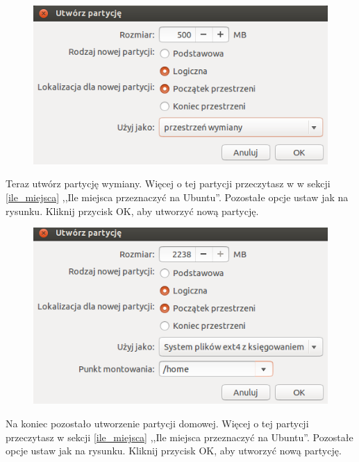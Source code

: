 \begin{figure}
                \includegraphics[width=\linewidth]{images/instalator_partycjonowanie_gparted_dodaj_swap.png}
\end{figure}
Teraz utwórz partycję wymiany. Więcej o tej partycji przeczytasz w w sekcji \ref{ile_miejsca} ,,Ile miejsca przeznaczyć na Ubuntu''. Pozostałe opcje ustaw jak na rysunku. Kliknij przycisk \textcolor{ubuntu_orange}{OK}, aby utworzyć nową partycję.
\begin{figure}
                \includegraphics[width=\linewidth]{images/instalator_partycjonowanie_gparted_dodaj_home.png}
\end{figure}
Na koniec pozostało utworzenie partycji domowej. Więcej o tej partycji przeczytasz w sekcji \ref{ile_miejsca} ,,Ile miejsca przeznaczyć na Ubuntu''. Pozostałe opcje ustaw jak na rysunku. Kliknij przycisk \textcolor{ubuntu_orange}{OK}, aby utworzyć nową partycję.


